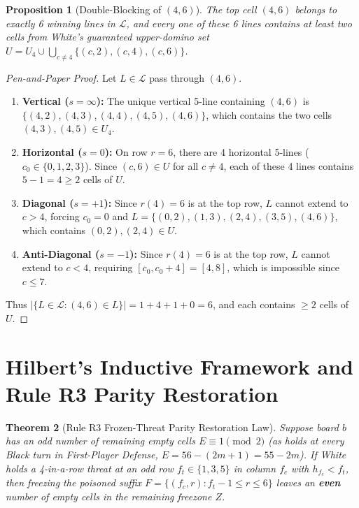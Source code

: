 \documentclass[11pt,reqno]{amsart}
\theoremstyle{plain}
\newtheorem{theorem}{Theorem}[section]
\newtheorem{proposition}[theorem]{Proposition}
\theoremstyle{definition}
\theoremstyle{remark}
\begin{document}
\begin{proposition}[Double-Blocking of $(4,6)$]
\label{prop:dead_cell_hand}
The top cell $(4,6)$ belongs to exactly 6 winning lines in $\mathcal{L}$, and every one of these 6 lines contains at least two cells from White's guaranteed upper-domino set $U = U_4 \cup \bigcup_{c \ne 4} \{(c,2),(c,4),(c,6)\}$.
\end{proposition}

\begin{proof}[Pen-and-Paper Proof]
Let $L \in \mathcal{L}$ pass through $(4,6)$.
\begin{enumerate}
    \item \textbf{Vertical ($s = \infty$):} The unique vertical 5-line containing $(4,6)$ is $\{(4,2),(4,3),(4,4),(4,5),(4,6)\}$, which contains the two cells $(4,3), (4,5) \in U_4$.
    \item \textbf{Horizontal ($s = 0$):} On row $r = 6$, there are 4 horizontal 5-lines ($c_0 \in \{0,1,2,3\}$). Since $(c,6) \in U$ for all $c \ne 4$, each of these 4 lines contains $5 - 1 = 4 \ge 2$ cells of $U$.
    \item \textbf{Diagonal ($s = +1$):} Since $r(4) = 6$ is at the top row, $L$ cannot extend to $c > 4$, forcing $c_0 = 0$ and $L = \{(0,2),(1,3),(2,4),(3,5),(4,6)\}$, which contains $(0,2), (2,4) \in U$.
    \item \textbf{Anti-Diagonal ($s = -1$):} Since $r(4) = 6$ is at the top row, $L$ cannot extend to $c < 4$, requiring $[c_0, c_0+4] = [4, 8]$, which is impossible since $c \le 7$.
\end{enumerate}
Thus $|\{L \in \mathcal{L} : (4,6) \in L\}| = 1 + 4 + 1 + 0 = 6$, and each contains $\ge 2$ cells of $U$.
\end{proof}

\section{Hilbert's Inductive Framework and Rule R3 Parity Restoration}

\begin{theorem}[Rule R3 Frozen-Threat Parity Restoration Law]
\label{thm:r3_hand}
Suppose board $b$ has an odd number of remaining empty cells $E \equiv 1 \pmod 2$ (as holds at every Black turn in First-Player Defense, $E = 56 - (2m+1) = 55 - 2m$). If White holds a 4-in-a-row threat at an odd row $f_t \in \{1, 3, 5\}$ in column $f_c$ with $h_{f_c} < f_t$, then freezing the poisoned suffix $F = \{(f_c, r) : f_t - 1 \le r \le 6\}$ leaves an \textbf{even} number of empty cells in the remaining freezone $Z$.
\end{theorem}
\end{document}
